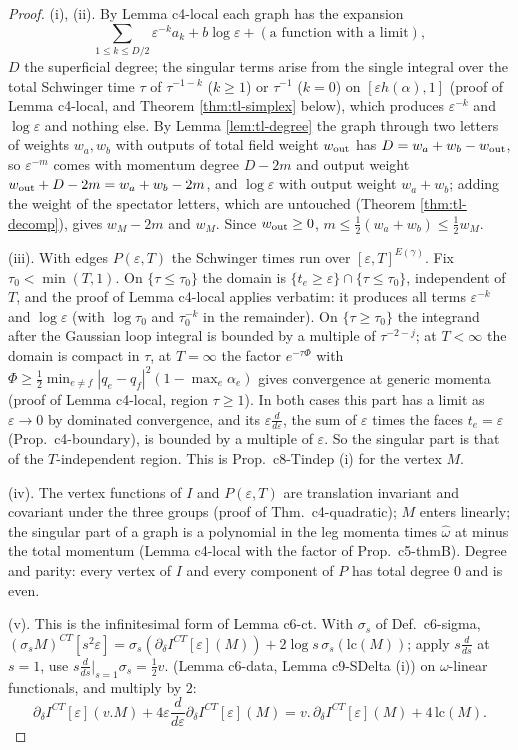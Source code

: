 \documentclass[11pt]{article}
\numberwithin{equation}{section}
\theoremstyle{plain}
\theoremstyle{definition}
\begin{document}
\begin{proof}
(i), (ii). By Lemma c4-local each graph has the expansion\[\sum_{1\le k\le D/2}\varepsilon^{-k}a_k+b\log\varepsilon+(\text{a function with a limit}),\] $D$ the superficial degree; the singular terms arise from the single integral over the total Schwinger time $\tau$ of $\tau^{-1-k}$ ($k\ge1$) or $\tau^{-1}$ ($k=0$) on $[\varepsilon h(\alpha),1]$ (proof of Lemma c4-local, and Theorem \ref{thm:tl-simplex} below), which produces $\varepsilon^{-k}$ and $\log\varepsilon$ and nothing else. By Lemma \ref{lem:tl-degree} the graph through two letters of weights $w_a,w_b$ with outputs of total field weight $w_{\rm out}$ has $D=w_a+w_b-w_{\rm out}$, so $\varepsilon^{-m}$ comes with momentum degree $D-2m$ and output weight $w_{\rm out}+D-2m=w_a+w_b-2m$, and $\log\varepsilon$ with output weight $w_a+w_b$; adding the weight of the spectator letters, which are untouched (Theorem \ref{thm:tl-decomp}), gives $w_M-2m$ and $w_M$. Since $w_{\rm out}\ge0$, $m\le\tfrac12(w_a+w_b)\le\tfrac12w_M$.

(iii). With edges $P(\varepsilon,T)$ the Schwinger times run over $[\varepsilon,T]^{E(\gamma)}$. Fix $\tau_0<\min(T,1)$. On $\{\tau\le\tau_0\}$ the domain is $\{t_e\ge\varepsilon\}\cap\{\tau\le\tau_0\}$, independent of $T$, and the proof of Lemma c4-local applies verbatim: it produces all terms $\varepsilon^{-k}$ and $\log\varepsilon$ (with $\log\tau_0$ and $\tau_0^{-k}$ in the remainder). On $\{\tau\ge\tau_0\}$ the integrand after the Gaussian loop integral is bounded by a multiple of $\tau^{-2-j}$; at $T<\infty$ the domain is compact in $\tau$, at $T=\infty$ the factor $e^{-\tau\Phi}$ with $\Phi\ge\tfrac12\min_{e\ne f}|q_e-q_f|^2(1-\max_e\alpha_e)$ gives convergence at generic momenta (proof of Lemma c4-local, region $\tau\ge1$). In both cases this part has a limit as $\varepsilon\to0$ by dominated convergence, and its $\varepsilon\frac{d}{d\varepsilon}$, the sum of $\varepsilon$ times the faces $t_e=\varepsilon$ (Prop.~c4-boundary), is bounded by a multiple of $\varepsilon$. So the singular part is that of the $T$-independent region. This is Prop.~c8-Tindep (i) for the vertex $M$.

(iv). The vertex functions of $I$ and $P(\varepsilon,T)$ are translation invariant and covariant under the three groups (proof of Thm.~c4-quadratic); $M$ enters linearly; the singular part of a graph is a polynomial in the leg momenta times $\hat\omega$ at minus the total momentum (Lemma c4-local with the factor of Prop.~c5-thmB). Degree and parity: every vertex of $I$ and every component of $P$ has total degree $0$ and is even.

(v). This is the infinitesimal form of Lemma c6-ct. With $\sigma_s$ of Def.~c6-sigma, $(\sigma_sM)^{CT}[s^2\varepsilon]=\sigma_s(\partial_\delta I^{CT}[\varepsilon](M))+2\log s\,\sigma_s(\mathrm{lc}(M))$; apply $s\frac{d}{ds}$ at $s=1$, use $s\frac{d}{ds}\big|_{s=1}\sigma_s=\tfrac12v.$ (Lemma c6-data, Lemma c9-SDelta (i)) on $\omega$-linear functionals, and multiply by $2$:
\[
\partial_\delta I^{CT}[\varepsilon](v.M)+4\varepsilon\frac{d}{d\varepsilon}\partial_\delta I^{CT}[\varepsilon](M)=v.\,\partial_\delta I^{CT}[\varepsilon](M)+4\,\mathrm{lc}(M).
\]
\end{proof}
\end{document}

